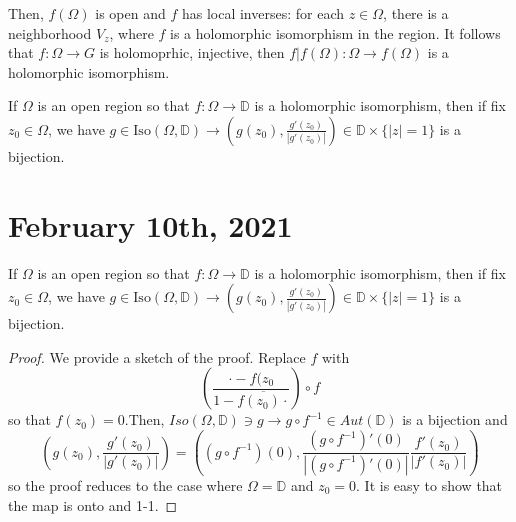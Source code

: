 \documentclass[12pt]{scrartcl}
\let \ol \overline
\begin{document}
Then, $f(\Omega)$ is open and $f$ has local inverses: for each $z \in \Omega$, there is a neighborhood $V_z
$, where $f$ is a holomorphic isomorphism in the region.  It follows that $f: \Omega \to G$ is holomoprhic, injective, then $ f\vert f(\Omega): \Omega \to f(\Omega)$ is a holomorphic isomorphism.  

If $\Omega$ is an open region so that $f: \Omega \to \mathbb D$ is a holomorphic isomorphism, then if fix $z_0 \in \Omega$, we have $g \in \text{Iso}(\Omega, \mathbb D) \to (g(z_0), \frac{g'(z_0)}{|g'(z_0)|}) \in \mathbb D \times \{|z| = 1\}$ is a bijection.
\pagebreak
\section{February 10th, 2021}
\begin{lemma}If $\Omega$ is an open region so that $f: \Omega \to \mathbb D$ is a holomorphic isomorphism, then if fix $z_0 \in \Omega$, we have $g \in \text{Iso}(\Omega, \mathbb D) \to (g(z_0), \frac{g'(z_0)}{|g'(z_0)|}) \in \mathbb D \times \{|z| = 1\}$ is a bijection.
\end{lemma}
\begin{proof} We provide a sketch of the proof.  Replace $f$ with $$\left (\frac{\cdot - f(z_0}{1 - \ol{f(z_0) \cdot}}\right ) \circ f$$
so that $f(z_0) = 0$.Then, $Iso(\Omega, \mathbb D) \ni g \to g \circ f^{-1} \in Aut(\mathbb D)$ is a bijection and 
$$\left (g(z_0), \frac{g'(z_0)}{|g'(z_0)|}\right ) = \left ((g \circ f^{-1})(0), \frac{(g \circ f^{-1})'(0)}{|(g \circ f^{-1})'(0)|} \frac{f'(z_0)}{|f'(z_0)|}\right )$$  
so the proof reduces to the case where $\Omega = \mathbb D$ and $z_0 = 0$.  It is easy to show that the map is onto and 1-1.
\end{proof}
\end{document}
